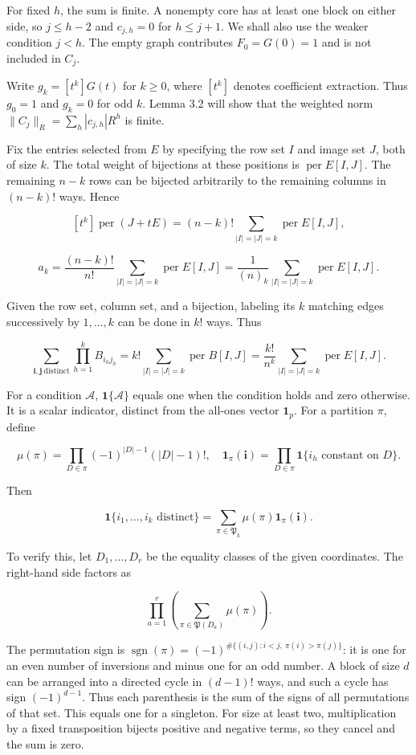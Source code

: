 \documentclass[11pt,a4paper]{article}
\begin{document}
For fixed \(h\), the sum is finite. A nonempty core has at least one block on either side, so \(j\le h-2\) and \(c_{j,h}=0\) for \(h\le j+1\). We shall also use the weaker condition \(j<h\). The empty graph contributes \(F_0=G(0)=1\) and is not included in \(C_j\).

Write \(g_k=[t^k]G(t)\) for \(k\ge0\), where \([t^k]\) denotes coefficient extraction. Thus \(g_0=1\) and \(g_k=0\) for odd \(k\). Lemma 3.2 will show that the weighted norm \(\|C_j\|_R=\sum_h|c_{j,h}|R^h\) is finite.

Fix the entries selected from \(E\) by specifying the row set \(I\) and image set \(J\), both of size \(k\). The total weight of bijections at these positions is \(\operatorname{per}E[I,J]\). The remaining \(n-k\) rows can be bijected arbitrarily to the remaining columns in \((n-k)!\) ways. Hence

\[
[t^k]\operatorname{per}(J+tE)
=(n-k)!\sum_{|I|=|J|=k}\operatorname{per}E[I,J],
\]

\[
a_k=\frac{(n-k)!}{n!}\sum_{|I|=|J|=k}\operatorname{per}E[I,J]
=\frac1{(n)_k}\sum_{|I|=|J|=k}\operatorname{per}E[I,J].
\]

Given the row set, column set, and a bijection, labeling its \(k\) matching edges successively by \(1,\ldots,k\) can be done in \(k!\) ways. Thus

\[
\sum_{\boldsymbol i,\boldsymbol j\ \mathrm{distinct}}\prod_{h=1}^kB_{i_hj_h}
=k!\sum_{|I|=|J|=k}\operatorname{per}B[I,J]
=\frac{k!}{n^k}\sum_{|I|=|J|=k}\operatorname{per}E[I,J].
\]

For a condition \(\mathcal A\), \(\mathbf1\{\mathcal A\}\) equals one when the condition holds and zero otherwise. It is a scalar indicator, distinct from the all-ones vector \(\mathbf1_p\). For a partition \(\pi\), define

\[
\mu(\pi)=\prod_{D\in\pi}(-1)^{|D|-1}(|D|-1)!,\quad
\mathbf1_\pi(\boldsymbol i)=\prod_{D\in\pi}\mathbf1\{i_h\text{ constant on }D\text{}\}.
\]

Then

\[
\mathbf1\{i_1,\ldots,i_k\text{ distinct}\}
=\sum_{\pi\in\mathfrak P_k}\mu(\pi)\mathbf1_\pi(\boldsymbol i).
\]

To verify this, let \(D_1,\ldots,D_r\) be the equality classes of the given coordinates. The right-hand side factors as

\[
\prod_{a=1}^r\left(\sum_{\pi\in\mathfrak P(D_a)}\mu(\pi)\right).
\]

The permutation sign is \(\operatorname{sgn}(\pi)=(-1)^{\#\{(i,j):i<j,\ \pi(i)>\pi(j)\}}\): it is one for an even number of inversions and minus one for an odd number. A block of size \(d\) can be arranged into a directed cycle in \((d-1)!\) ways, and such a cycle has sign \((-1)^{d-1}\). Thus each parenthesis is the sum of the signs of all permutations of that set. This equals one for a singleton. For size at least two, multiplication by a fixed transposition bijects positive and negative terms, so they cancel and the sum is zero.
\end{document}
